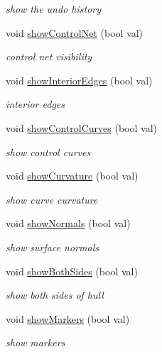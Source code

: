 \begin{DoxyCompactItemize}
\begin{DoxyCompactList}\small\item\em show the undo history \end{DoxyCompactList}\item 
void \hyperlink{classShipCAD_1_1Controller_a81d04dc566ba580aa225c5369767220f}{show\+Control\+Net} (bool val)
\begin{DoxyCompactList}\small\item\em control net visibility \end{DoxyCompactList}\item 
void \hyperlink{classShipCAD_1_1Controller_a3f722582d47e27a34deb467156056f3b}{show\+Interior\+Edges} (bool val)
\begin{DoxyCompactList}\small\item\em interior edges \end{DoxyCompactList}\item 
void \hyperlink{classShipCAD_1_1Controller_a2c3339b26ab0856a66720e370523d80c}{show\+Control\+Curves} (bool val)
\begin{DoxyCompactList}\small\item\em show control curves \end{DoxyCompactList}\item 
void \hyperlink{classShipCAD_1_1Controller_a9ba96a9070361816f926d8b0d2becd38}{show\+Curvature} (bool val)
\begin{DoxyCompactList}\small\item\em show curve curvature \end{DoxyCompactList}\item 
void \hyperlink{classShipCAD_1_1Controller_adb1d1402849db292b29ec78ba89639d9}{show\+Normals} (bool val)
\begin{DoxyCompactList}\small\item\em show surface normals \end{DoxyCompactList}\item 
void \hyperlink{classShipCAD_1_1Controller_a798c513f6454b27141c93bb7a9681394}{show\+Both\+Sides} (bool val)
\begin{DoxyCompactList}\small\item\em show both sides of hull \end{DoxyCompactList}\item 
void \hyperlink{classShipCAD_1_1Controller_a89d94deb40f340ce439d53c781f72bcf}{show\+Markers} (bool val)
\begin{DoxyCompactList}\small\item\em show markers \end{DoxyCompactList}\item 

\end{DoxyCompactItemize}
